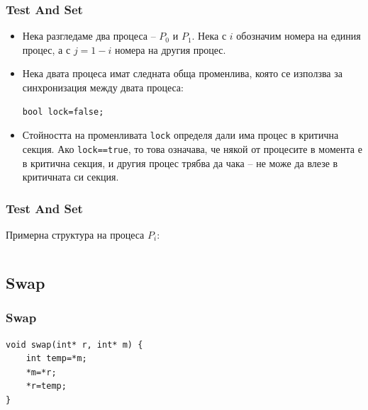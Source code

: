 \documentclass[ignorenonframetext, hyperref=unicode]{beamer}
\begin{document}
\begin{frame}[containsverbatim]
\frametitle{Test And Set}
\begin{itemize}
\item Нека разгледаме два процеса -- $P_0$ и $P_1$. Нека с $i$ обозначим
  номера на единия процес, а с $j=1-i$ номера на другия процес.
\item Нека двата процеса имат следната обща променлива, която се използва за
синхронизация между двата процеса: 
\begin{lstlisting}[numbers=none]
bool lock=false;
\end{lstlisting}
\item Стойността на променливата \lstinline{lock} определя дали има процес в
критична секция. Ако \lstinline{lock==true}, то това означава, че някой от
процесите в момента е в критична секция, и другия процес трябва да чака -- не
може да влезе в критичната си секция.
\end{itemize}
\end{frame}


\begin{frame}[containsverbatim]
\frametitle{Test And Set}
Примерна структура на процеса $P_i$:
\begin{columns}
\end{columns}
\end{frame}


\subsection{Swap}

\begin{frame}[containsverbatim]
\frametitle{Swap}
\begin{lstlisting}
void swap(int* r, int* m) {
	int temp=*m;
	*m=*r;
	*r=temp;
}
\end{lstlisting}
\end{frame}
\end{document}

